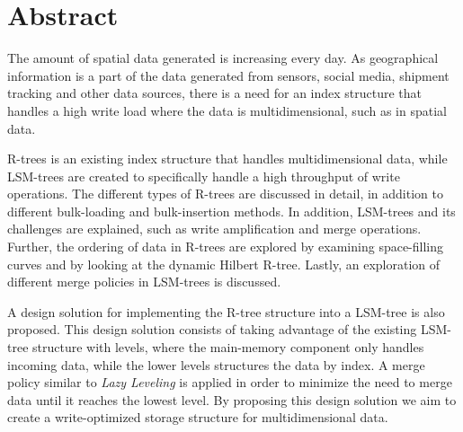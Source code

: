 \chapter*{Abstract}
The amount of spatial data generated is increasing every day. As geographical information is a part of the data generated from sensors, social media, shipment tracking and other data sources, there is a need for an index structure that handles a high write load where the data is multidimensional, such as in spatial data.\newline

\noindent
R-trees is an existing index structure that handles multidimensional data, while LSM-trees are created to specifically handle a high throughput of write operations. The different types of R-trees are discussed in detail, in addition to different bulk-loading and bulk-insertion methods. In addition, LSM-trees and its challenges are explained, such as write amplification and merge operations. Further, the ordering of data in R-trees are explored by examining space-filling curves and by looking at the dynamic Hilbert R-tree. Lastly, an exploration of different merge policies in LSM-trees is discussed.\newline

\noindent
A design solution for implementing the R-tree structure into a LSM-tree is also proposed. This design solution consists of taking advantage of the existing LSM-tree structure with levels, where the main-memory component only handles incoming data, while the lower levels structures the data by index. A merge policy similar to \emph{Lazy Leveling} is applied in order to minimize the need to merge data until it reaches the lowest level. By proposing this design solution we aim to create a write-optimized storage structure for multidimensional data. 
